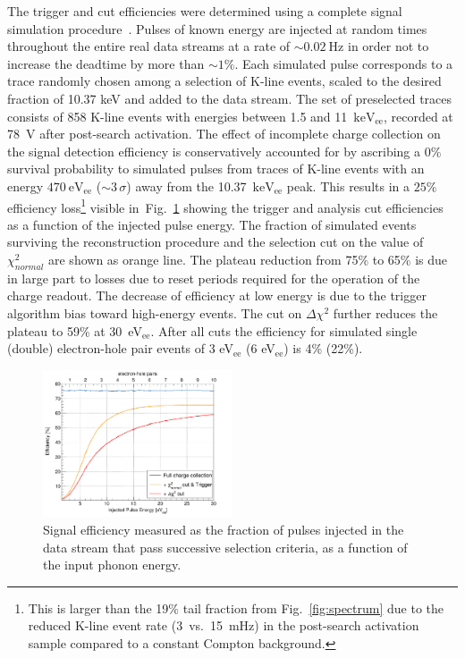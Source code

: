 \documentclass[aps,nofootinbib,floatfix,showpacs,preprintnumbers,twocolumn,superscriptaddress]{revtex4}
\begin{document}
The trigger and cut efficiencies were determined using a complete signal simulation procedure~\cite{RED20}.
Pulses of known energy are injected at random times throughout the entire real data streams at a rate of $\sim 0.02~\mathrm{Hz}$ in order not to increase the deadtime by more than $\sim1\%$.
Each simulated pulse corresponds to a trace randomly chosen among a selection of K-line events, scaled to the desired fraction of 10.37 keV and added to the data stream. The set of preselected traces consists of 858 K-line events with energies between 1.5 and 11~$\mathrm{keV_{ee}}$, recorded at 78~V after post-search activation. The effect of incomplete charge collection on the signal detection efficiency is conservatively accounted for by ascribing a 0\% survival probability to simulated pulses from traces of K-line events with an energy $470~\mathrm{eV_{ee}}$ ($\sim3\,\sigma$) away from the 10.37~$\mathrm{keV_{ee}}$ peak. This results in a $25\%$ efficiency loss\footnote{This is larger than the 19\% tail fraction from Fig.~\ref{fig:spectrum} due to the reduced  K-line event rate (3~vs.~15~mHz) in the post-search activation sample compared to a constant Compton background.} visible in~Fig.~\ref{fig:efficiency} showing the trigger and analysis cut efficiencies as a function of the injected pulse energy. The fraction of simulated events surviving the reconstruction procedure and the selection cut on the value of $\chi^2_{normal}$ are shown as orange line. The plateau reduction from 75\% to 65\% is due in large part to losses due to reset periods required for the operation of the charge readout. 
The decrease of efficiency at low energy is due to the trigger algorithm bias toward high-energy events. The cut on $\Delta\chi^2$ further reduces the plateau to 59\% at 30~eV$_{\mathrm{ee}}$.
After all cuts the efficiency for simulated single (double) electron-hole pair events of 3 eV$_{\mathrm{ee}}$ (6 eV$_{\mathrm{ee}}$) is 4\% (22\%).
\begin{figure}[t]
\includegraphics[width=0.5\textwidth,angle=0]{Figures/nouveauplotefficiency.pdf}
\caption{Signal efficiency measured as the fraction of pulses injected in the data stream that pass successive selection criteria, as a function of the input phonon energy.} 
\label{fig:efficiency}
\end{figure}  
\end{document}
